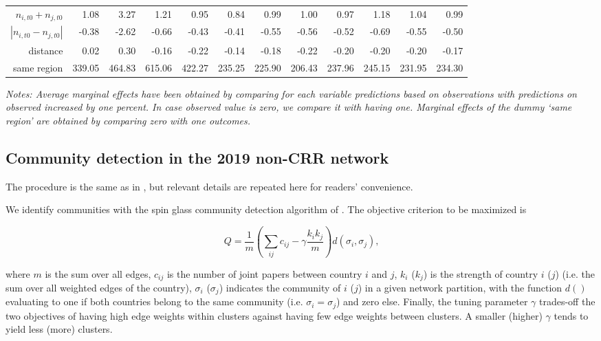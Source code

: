 \begin{landscape}
\begin{table}[ht]
\begin{threeparttable}
\begin{tabular}{rrrrrrrrrrrr}
   $n_{i,t0} + n_{j,t0}$   & 1.08 & 3.27 & 1.21 & 0.95 & 0.84 & 0.99 & 1.00 & 0.97 & 1.18 & 1.04 & 0.99 \\ 
  $|n_{i,t0} - n_{j,t0}|$ & -0.38 & -2.62 & -0.66 & -0.43 & -0.41 & -0.55 & -0.56 & -0.52 & -0.69 & -0.55 & -0.50 \\ 
  distance & 0.02 & 0.30 & -0.16 & -0.22 & -0.14 & -0.18 & -0.22 & -0.20 & -0.20 & -0.20 & -0.17 \\ 
  same region & 339.05 & 464.83 & 615.06 & 422.27 & 235.25 & 225.90 & 206.43 & 237.96 & 245.15 & 231.95 & 234.30 \\ 
   \hline
\end{tabular}
  \begin{tablenotes}
  \footnotesize
  \item {\it Notes: Average marginal effects have been obtained by comparing for each variable predictions based on observations with predictions on observed increased by one percent. In case observed value is zero, we compare it with having one. Marginal effects of the dummy `same region' are obtained by comparing zero with one outcomes.}
  \end{tablenotes}
 \end{threeparttable}
\end{table}

\end{landscape}


\subsection{Community detection in the 2019 non-CRR network}
\label{Appendix:Communities}

The procedure is the same as in \citet{FitzgeraldEtAl2021}, but relevant details are repeated here for readers' convenience.

We identify communities with the spin glass community detection algorithm of \cite{ReichardtBornholdt2006}. The objective criterion to be maximized is 

\begin{equation*}
	Q = \frac{1}{m} \left( \sum_{ij} c_{ij} - \gamma \frac{k_i k_j}{m} \right) d(\sigma_i,\sigma_j) \text{,} 
\end{equation*}

where $m$ is the sum over all edges, $c_{ij}$ is the number of joint papers between country $i$ and $j$, $k_i$ ($k_j$) is the strength of country $i$ ($j$) (i.e. the sum over all weighted edges of the country), $\sigma_i$ ($\sigma_j$) indicates the community of $i$ ($j$) in a given network partition, with the function $d()$ evaluating to one if both countries belong to the same community (i.e. $\sigma_i = \sigma_j$) and zero else. Finally, the tuning parameter $\gamma$ trades-off the two objectives of having high edge weights within clusters against having few edge weights between clusters. A smaller (higher) $\gamma$ tends to yield less (more) clusters. 

